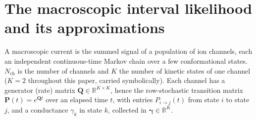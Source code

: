 \section*{The macroscopic interval likelihood and its approximations}

A macroscopic current is the summed signal of a population of ion channels, each an
independent continuous-time Markov chain over a few conformational states. $N_{\mathrm{ch}}$
is the number of channels and $K$ the number of kinetic states of one channel ($K=2$ %
throughout this paper, carried symbolically). Each channel has a generator (rate) matrix
$\mathbf{Q}\in\mathbb{R}^{K\times K}$, hence the row-stochastic transition matrix
$\mathbf{P}(t)=e^{\mathbf{Q}t}$ over an elapsed time $t$, with entries $P_{i\to j}(t)$ from
state $i$ to state $j$, and a conductance $\gamma_k$ in state $k$, collected in
$\bm{\gamma}\in\mathbb{R}^{K}$.

